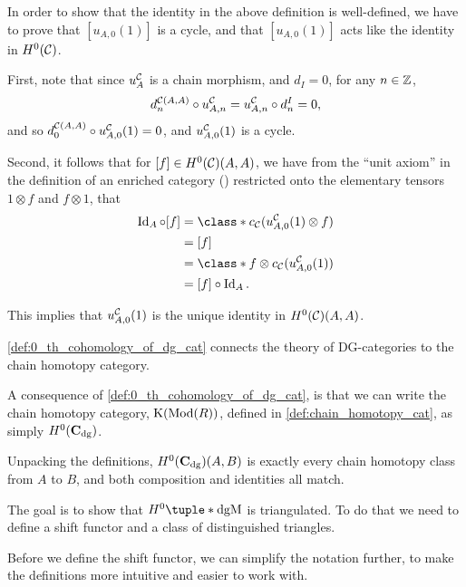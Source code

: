 \begin{remark}
    In order to show that the identity in the above definition is well-defined, we have to prove that \( [u_{A, 0} (1)] \) is a cycle, and that \( [u_{A, 0} (1)] \) acts like the identity in \( H^0({\mathcal{C}}) \).

    First, note that since \( u_A^{{\mathcal{C}}} \) is a chain morphism, and \( d_I = 0 \), for any \( n \in {\mathbb{Z}} \),
    \[
        d_n^{{\mathcal{C}}(A, A)} \circ u_{A, n}^{{\mathcal{C}}} = u_{A, n}^{{\mathcal{C}}} \circ d_n^I = 0,
    \]
    and so \( d_0^{{\mathcal{C}}(A, A)} \circ u_{A, 0}^{{\mathcal{C}}} (1) = 0 \), and \( u_{A, 0}^{{\mathcal{C}}} (1) \) is a cycle.

    Second, it follows that for \( [f] \in H^0({\mathcal{C}})(A, A) \), we have from the ``unit axiom'' in the definition of an enriched category (\cite[Diagram 6.10]{Borceux_1994}) restricted onto the elementary tensors \( 1 \otimes f \) and \( f \otimes 1 \), that
    \begin{align*}
        \Id_A \circ [f] &= \class*{ c_{\Cc}(u_{A, 0}^{\Cc} (1) \otimes f) } \\
        &= [f] \\
        &= \class*{ f \otimes c_{\Cc}(u_{A, 0}^{\Cc} (1)) } \\
        &= [f] \circ \Id_A.
    \end{align*}

    This implies that \( u_{A, 0}^{{\mathcal{C}}} (1) \) is the unique identity in \( H^0({\mathcal{C}})(A, A) \).
\end{remark}

\autoref{def:0_th_cohomology_of_dg_cat} connects the theory of DG-categories to the chain homotopy category.

\begin{remark}
    \label{rem:c_dg_h_0_is_chain_homotopy_cat}
    A consequence of \autoref{def:0_th_cohomology_of_dg_cat}, is that we can write the chain homotopy category, \( \operatorname{K}(\operatorname{Mod}(R)) \), defined in \autoref{def:chain_homotopy_cat}, as simply \( H^0(\operatorname{\mathbf{C}}_{\operatorname{dg}}) \).
    
    Unpacking the definitions, \( H^0(\operatorname{\mathbf{C}}_{\operatorname{dg}})(A, B) \) is exactly every chain homotopy class from \( A \) to \( B \), and both composition and identities all match.
\end{remark}

The goal is to show that \( H^0\tuple*{\dgM} \) is triangulated. To do that we need to define a shift functor and a class of distinguished triangles.

Before we define the shift functor, we can simplify the notation further, to make the definitions more intuitive and easier to work with.

